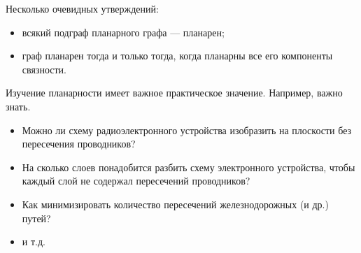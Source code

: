 Несколько очевидных утверждений:
\begin{itemize}
    \item всякий подграф планарного графа --- планарен;
    \item граф планарен тогда и только тогда, когда планарны все его компоненты связности.
\end{itemize}

Изучение планарности имеет важное практическое значение. Например, важно знать.
\begin{itemize}
    \item Можно ли схему радиоэлектронного устройства изобразить на плоскости без пересечения проводников? 
    \item На сколько слоев понадобится разбить схему электронного устройства, чтобы каждый слой не содержал пересечений проводников?
    \item Как минимизировать количество пересечений железнодорожных (и др.) путей?
    \item и т.д.
\end{itemize}

